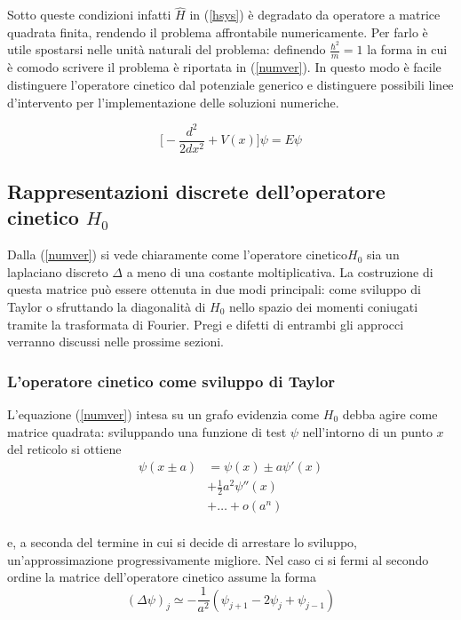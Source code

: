 \documentclass[a4paper,11pt,twoside,twocolumn]{article}
\begin{document}
Sotto queste condizioni infatti \(\hat{H}\) in (\ref{hsys}) è degradato da operatore a matrice quadrata finita, rendendo il problema affrontabile numericamente. Per farlo è utile spostarsi nelle unità naturali del problema: definendo \( \frac{\hbar^2}{m} = 1\) la forma in cui è comodo scrivere il problema è riportata in (\ref{numver}). In questo modo è facile distinguere l'operatore cinetico dal potenziale generico e distinguere possibili linee d'intervento per l'implementazione delle soluzioni numeriche.

\begin{equation}
    \Bigg[-\frac{d^2}{2dx^2}+V(x)\Bigg]\psi=E\psi
    \label{numver}
\end{equation}

\subsection{Rappresentazioni discrete dell'operatore cinetico \(H_0\)}

Dalla (\ref{numver}) si vede chiaramente come l'operatore cinetico\(H_0\) sia un laplaciano discreto \(\Delta\) a meno di una costante moltiplicativa. La costruzione di questa matrice può essere ottenuta in due modi principali: come sviluppo di Taylor o  sfruttando la diagonalità di \(H_0\) nello spazio dei momenti coniugati tramite la trasformata di Fourier. Pregi e difetti di entrambi gli approcci verranno discussi nelle prossime sezioni.

\subsubsection{L'operatore cinetico come sviluppo di Taylor}

L'equazione (\ref{numver}) intesa su un grafo evidenzia come \(H_0\) debba agire come matrice quadrata: sviluppando una funzione di test \(\psi\) nell'intorno di un punto \(x\) del reticolo si ottiene
\begin{equation}
    \begin{aligned}
    \psi(x\pm a)&=\psi(x)\pm a\psi'(x) \\
                &+ \frac{1}{2}a^2\psi''(x) \\
                &+ \dots + o(a^n) \\
    \end{aligned}
\end{equation}

e, a seconda del termine in cui si decide di arrestare lo sviluppo, un'approssimazione progressivamente migliore. Nel caso ci si fermi al secondo ordine la matrice dell'operatore cinetico assume la forma
\begin{equation}
    (\Delta\psi)_j \simeq -\frac{1}{a^2}(\psi_{j+1}-2\psi_j+\psi_{j-1})
\end{equation}
\end{document}
